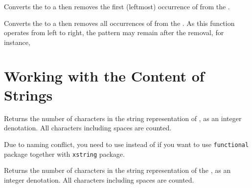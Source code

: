\documentclass[oneside]{book}
\begin{document}
\begin{function}{\StrVarRemoveOnce}
\begin{syntax}
  
\end{syntax}
Converts the  to a  then
removes the first (leftmost) occurrence of  from the .
\begin{demohigh}
\StrSet {}
\StrVarRemoveOnce {}
\StrUse \lTmpaStr
\end{demohigh}
\end{function}

\begin{function}{\StrVarRemoveAll}
\begin{syntax}
  
\end{syntax}
Converts the  to a  then
removes all occurrences of  from the .
As this function operates from left to right,
the pattern  may remain after the removal, for instance,
\begin{demohigh}
\StrSet {}
\StrVarRemoveAll {}
\TlUse \lTmpaStr
\end{demohigh}
\end{function}

\section{Working with the Content of Strings}

\begin{function}{\StrCount}
\begin{syntax}
 
\end{syntax}
Returns the number of characters in the string representation of ,
as an integer denotation. All characters including spaces are counted.
\begin{demohigh}
\end{demohigh}
Due to naming conflict, you need to use  instead of 
if you want to use \verb!functional! package together with \verb!xstring! package.
\end{function}

\begin{function}{\StVarCount}
\begin{syntax}
 
\end{syntax}
Returns the number of characters in the string representation of the ,
as an integer denotation. All characters including spaces are counted.
\begin{demohigh}
\StrSet {}
\StrVarCount \lTmpaStr
\end{demohigh}
\end{function}
\end{document}
